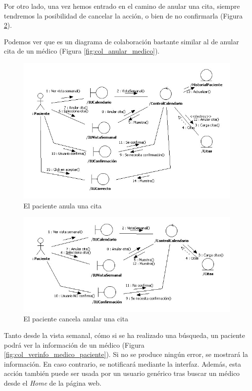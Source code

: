 		Por otro lado, una vez hemos entrado en el camino de anular una cita, siempre tendremos la posibilidad de cancelar la acción, o bien de no confirmarla (Figura \ref{fig:col_anularcita_paciente_cancelar}).
		
		Podemos ver que es un diagrama de colaboración bastante similar al de anular cita de un médico (Figura \ref{fig:col_anular_medico}).
		
		\begin{figure}[H]
		  \centering
		    \includegraphics[width=16cm]{img/jpg/colaboraciones/26_AnularCitaPaciente.jpg}
		  \caption{El paciente anula una cita}
		  \label{fig:col_anulacita_paciente}
		\end{figure}
		
		\begin{figure}[H]
		  \centering
		    \includegraphics[width=16cm]{img/jpg/colaboraciones/27_AnularCitaPacienteCancelar.jpg}
		  \caption{El paciente cancela anular una cita}
		  \label{fig:col_anularcita_paciente_cancelar}
		\end{figure}
		
		Tanto desde la vista semanal, cómo si se ha realizado una búsqueda, un paciente podrá ver la información de un médico (Figura \ref{fig:col_verinfo_medico_paciente}). Si no se produce ningún error, se mostrará la información. En caso contrario, se notificará mediante la interfaz. Además, esta acción también puede ser usada por un usuario genérico tras buscar un médico desde el \textit{Home} de la página web.
		
